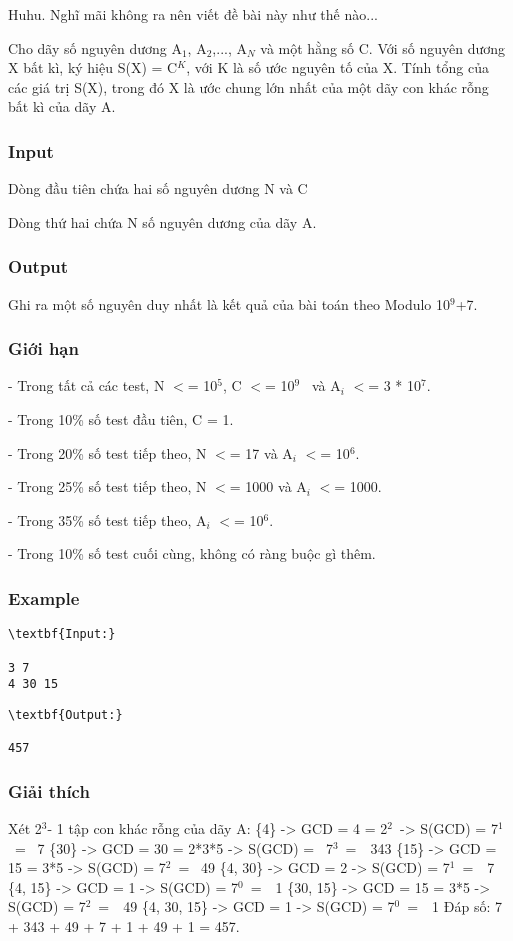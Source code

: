 

Huhu. Nghĩ mãi không ra nên viết đề bài này như thế nào...

Cho dãy số nguyên dương A$_1$, A$_2$,..., A$_N$ và một hằng số C. Với số nguyên dương X bất kì, ký hiệu S(X) = C$^K$, với K là số ước nguyên tố của X. Tính tổng của các giá trị S(X), trong đó X là ước chung lớn nhất của một dãy con khác rỗng bất kì của dãy A.

\subsubsection{Input}

Dòng đầu tiên chứa hai số nguyên dương N và C

Dòng thứ hai chứa N số nguyên dương của dãy A.

\subsubsection{Output}

Ghi ra một số nguyên duy nhất là kết quả của bài toán theo Modulo 10$^9$+7.

\subsubsection{Giới hạn}

- Trong tất cả các test, N $<$= 10$^5$, C $<$= 10$^9$  và A$_i$ $<$= 3 * 10$^7$.

- Trong 10\% số test đầu tiên, C = 1.

- Trong 20\% số test tiếp theo, N $<$= 17 và A$_i$ $<$= 10$^6$.

- Trong 25\% số test tiếp theo, N $<$= 1000 và A$_i$ $<$= 1000.

- Trong 35\% số test tiếp theo, A$_i$ $<$= 10$^6$.

- Trong 10\% số test cuối cùng, không có ràng buộc gì thêm.

\subsubsection{Example}
\begin{verbatim}
\textbf{Input:}

3 7
4 30 15\end{verbatim}
\begin{verbatim}
\textbf{Output:}

457\end{verbatim}

\subsubsection{Giải thích}

Xét 2$^3 $- 1 tập con khác rỗng của dãy A:
\{4\} -> GCD = 4 = 2$^2$ -> S(GCD) = 7$^1$ =  7
\{30\} -> GCD = 30 = 2*3*5 -> S(GCD) =  7$^3$ =  343
\{15\} -> GCD = 15 = 3*5 -> S(GCD) = 7$^2$ =  49
\{4, 30\} -> GCD = 2 -> S(GCD) = 7$^1$ =  7
\{4, 15\} -> GCD = 1 -> S(GCD) = 7$^0$ =  1
\{30, 15\} -> GCD = 15 = 3*5 -> S(GCD) = 7$^2$ =  49
\{4, 30, 15\} -> GCD = 1 -> S(GCD) = 7$^0$ =  1
Đáp số: 7 + 343 + 49 + 7 + 1 + 49 + 1 = 457.
